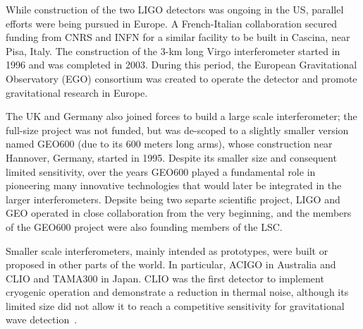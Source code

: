 While construction of the two LIGO detectors was ongoing in the US, parallel efforts 
were being pursued in Europe. A French-Italian collaboration secured funding from CNRS and INFN for a 
similar facility to be built in Cascina, near Pisa, Italy.
The construction of the 3-km long Virgo interferometer started in 1996 and was completed in 2003.
During this period, the European Gravitational Observatory (EGO) consortium was created to operate the detector 
and promote gravitational research in Europe.

The UK and Germany also joined forces to build a large scale interferometer; the full-size project was not funded, but was de-scoped to a slightly smaller version named GEO600 (due to its 600 meters long arms), 
whose construction near Hannover, Germany, started in 1995. Despite its smaller size and consequent limited sensitivity, over the years GEO600 played a fundamental role in pioneering many innovative technologies that would later be integrated in the larger interferometers.
Depsite being two separte scientific project, LIGO and GEO operated in close collaboration from the very beginning, and the members of the GEO600 project were also founding members of the LSC.

Smaller scale interferometers, mainly intended as prototypes, were built or 
proposed in other parts of the world. In particular, ACIGO in Australia and 
CLIO and TAMA300 in Japan. CLIO was the first detector to implement cryogenic operation and demonstrate a reduction in thermal noise, although its limited size did not allow it to reach a competitive sensitivity for gravitational wave detection~\cite{CLIOthermal}.

